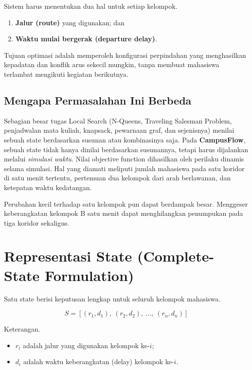 \documentclass[11pt,a4paper]{article}
\begin{document}
Sistem harus menentukan dua hal untuk setiap kelompok.

\begin{enumerate}[leftmargin=2em,itemsep=0.1em]
  \item \textbf{Jalur (route)} yang digunakan; dan
  \item \textbf{Waktu mulai bergerak (departure delay)}.
\end{enumerate}

Tujuan optimasi adalah memperoleh konfigurasi perpindahan yang menghasilkan kepadatan dan konflik arus sekecil mungkin, tanpa membuat mahasiswa terlambat mengikuti kegiatan berikutnya.

\subsection{Mengapa Permasalahan Ini Berbeda}

Sebagian besar tugas Local Search (N-Queens, Traveling Salesman Problem, penjadwalan mata kuliah, knapsack, pewarnaan graf, dan sejenisnya) menilai sebuah state berdasarkan susunan atau kombinasinya saja. Pada \textbf{CampusFlow}, sebuah state tidak hanya dinilai berdasarkan susunannya, tetapi harus dijalankan melalui \emph{simulasi waktu}. Nilai objective function dihasilkan oleh perilaku dinamis selama simulasi. Hal yang diamati meliputi jumlah mahasiswa pada satu koridor di satu menit tertentu, pertemuan dua kelompok dari arah berlawanan, dan ketepatan waktu kedatangan.

Perubahan kecil terhadap satu kelompok pun dapat berdampak besar. Menggeser keberangkatan kelompok B satu menit dapat menghilangkan penumpukan pada tiga koridor sekaligus.

\section{Representasi State (Complete-State Formulation)}

Satu state berisi keputusan lengkap untuk seluruh kelompok mahasiswa.

\[
S = [(r_1, d_1),\ (r_2, d_2),\ \ldots,\ (r_n, d_n)]
\]

Keterangan.
\begin{itemize}[leftmargin=2em,itemsep=0.1em]
  \item $r_i$ adalah jalur yang digunakan kelompok ke-$i$;
  \item $d_i$ adalah waktu keberangkatan (delay) kelompok ke-$i$.
\end{itemize}
\end{document}
